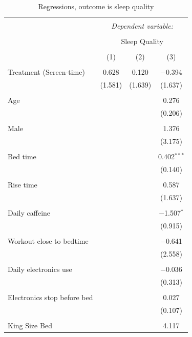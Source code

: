 \documentclass[12pt,]{article}
\begin{document}
\begin{table}[!htbp] \centering 
  \caption{\label{tab:quality_regressions} Regressions, outcome is sleep quality} 
  \label{} 
\begin{tabular}{@{\extracolsep{5pt}}lccc} 
\\[-1.8ex]\hline 
\hline \\[-1.8ex] 
 & \multicolumn{3}{c}{\textit{Dependent variable:}} \\ 
\cline{2-4} 
\\[-1.8ex] & \multicolumn{3}{c}{Sleep Quality} \\ 
\\[-1.8ex] & (1) & (2) & (3)\\ 
\hline \\[-1.8ex] 
 Treatment (Screen-time) & 0.628 & 0.120 & $-$0.394 \\ 
  & (1.581) & (1.639) & (1.637) \\ 
  & & & \\ 
 Age &  &  & 0.276 \\ 
  &  &  & (0.206) \\ 
  & & & \\ 
 Male &  &  & 1.376 \\ 
  &  &  & (3.175) \\ 
  & & & \\ 
 Bed time &  &  & 0.402$^{***}$ \\ 
  &  &  & (0.140) \\ 
  & & & \\ 
 Rise time &  &  & 0.587 \\ 
  &  &  & (1.637) \\ 
  & & & \\ 
 Daily caffeine &  &  & $-$1.507$^{*}$ \\ 
  &  &  & (0.915) \\ 
  & & & \\ 
 Workout close to bedtime &  &  & $-$0.641 \\ 
  &  &  & (2.558) \\ 
  & & & \\ 
 Daily electronics use &  &  & $-$0.036 \\ 
  &  &  & (0.313) \\ 
  & & & \\ 
 Electronics stop before bed &  &  & 0.027 \\ 
  &  &  & (0.107) \\ 
  & & & \\ 
 King Size Bed &  &  & 4.117 \\ 

\end{tabular}
\end{table}
\end{document}
